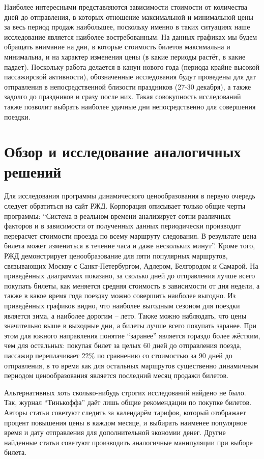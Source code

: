 \documentclass[conference]{IEEEtran}
\begin{document}
Наиболее интересными представляются зависимости стоимости от количества дней до отправления, в которых отношение максимальной и минимальной цены за весь период продаж наибольшее, поскольку именно в таких ситуациях наше исследование является наиболее востребованным. На данных графиках мы будем обращать внимание на дни, в которые стоимость билетов максимальна и минимальна, и на характер изменения цены (в какие периоды растёт, в какие падает). Поскольку работа делается в канун нового года (периода крайне высокой пассажирской активности), обозначенные исследования будут проведены для дат отправления в непосредственной близости праздников (27-30 декабря), а также задолго до праздников и сразу после них. Такая совокупность исследований также позволит выбрать наиболее удачные дни непосредственно для совершения поездки.

\section{Обзор и исследование аналогичных решений}

Для исследования программы динамического ценообразования в первую очередь следует обратиться на сайт РЖД. Корпорация описывает только общие черты программы: ``Система в реальном времени анализирует сотни различных факторов и в зависимости от полученных данных периодически производит перерасчет стоимости проезда по всему маршруту следования. В результате цена билета может измениться в течение часа и даже нескольких минут''.
Кроме того, РЖД демонстрирует ценообразование для пяти популярных маршрутов, связывающих Москву с Санкт-Петербургом, Адлером, Белгородом и Самарой. На приведённых диаграммах показано, за сколько дней до отправления лучше всего покупать билеты, как меняется средняя стоимость в зависимости от дня недели, а также в какое время года поездку можно совершить наиболее выгодно. %
Из приведённых графиков видно, что наиболее выгодным сезоном для поездки является зима, а наиболее дорогим -- лето. Также можно наблюдать, что цены значительно выше в выходные дни, а билеты лучше всего покупать заранее. При этом для южного направления понятие ``заранее'' является гораздо более жёстким, чем для остальных: покупая билет за целых 60 дней до отправления поезда, пассажир переплачивает 22\% по сравнению со стоимостью за 90 дней до отправления, в то время как для остальных маршрутов существенно динамичным периодом ценообразования является последний месяц продажи билетов.

Альтернативных хоть сколько-нибудь строгих исследований найдено не было. Так, журнал ``Тинькоффа'' %
даёт лишь общие рекомендации по покупке билетов. Авторы статьи советуют следить за календарём тарифов, который отображает процент повышения цены в каждом месяце, и выбирать наименее популярное время и дату отправления для дополнительной экономии денег. Другие найденные статьи советуют производить аналогичные манипуляции при выборе билета.
\end{document}
